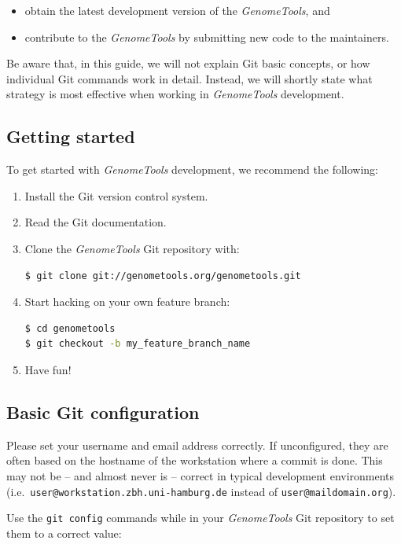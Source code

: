 \documentclass[11pt,final]{article}
\newcommand{\keyword}[1]{\lstinline{#1}}
\newcommand{\Gt}[0]{\emph{GenomeTools}\xspace}
\begin{document}
\begin{itemize}
\item
obtain the latest development version of the \Gt , and
\item
contribute to the \Gt by submitting new code to the maintainers.
\end{itemize}

Be aware that, in this guide, we will not explain Git basic concepts, or how
individual Git commands work in detail. Instead, we will shortly state what
strategy is most effective when working in \Gt development.

\subsection{Getting started}
To get started with \Gt development, we recommend the following:
\begin{enumerate}
  \item Install the Git version control system.
  \item Read the Git documentation.
  \item Clone the \Gt Git repository with:
    \begin{lstlisting}[language=sh]
$ git clone git://genometools.org/genometools.git
    \end{lstlisting}%

  \item Start hacking on your own feature branch:
    \begin{lstlisting}[language=sh]
$ cd genometools
$ git checkout -b my_feature_branch_name
    \end{lstlisting}
   \item Have fun!
\end{enumerate}

\subsection{Basic Git configuration}

Please set your username and email address correctly. If unconfigured, they are
often based on the hostname of the workstation where a commit is done. This may
not be -- and almost never is --  correct in typical development environments
(i.e.\ \keyword{user@workstation.zbh.uni-hamburg.de} instead of
\keyword{user@maildomain.org}).

Use the \keyword{git config} commands while in your \Gt Git repository to set them
to a correct value:
\end{document}
